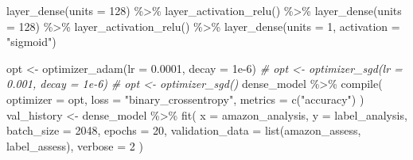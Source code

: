 \documentclass[
]{article}
\newenvironment{Shaded}{}{}
\newcommand{\AttributeTok}[1]{\textcolor[rgb]{0.49,0.56,0.16}{#1}}
\newcommand{\CommentTok}[1]{\textcolor[rgb]{0.38,0.63,0.69}{\textit{#1}}}
\newcommand{\DecValTok}[1]{\textcolor[rgb]{0.25,0.63,0.44}{#1}}
\newcommand{\FloatTok}[1]{\textcolor[rgb]{0.25,0.63,0.44}{#1}}
\newcommand{\FunctionTok}[1]{\textcolor[rgb]{0.02,0.16,0.49}{#1}}
\newcommand{\NormalTok}[1]{#1}
\newcommand{\OtherTok}[1]{\textcolor[rgb]{0.00,0.44,0.13}{#1}}
\newcommand{\SpecialCharTok}[1]{\textcolor[rgb]{0.25,0.44,0.63}{#1}}
\newcommand{\StringTok}[1]{\textcolor[rgb]{0.25,0.44,0.63}{#1}}
\begin{document}
\begin{Shaded}
\begin{Highlighting}[]
  \FunctionTok{layer\_dense}\NormalTok{(}\AttributeTok{units =} \DecValTok{128}\NormalTok{) }\SpecialCharTok{\%\textgreater{}\%}
  \FunctionTok{layer\_activation\_relu}\NormalTok{() }\SpecialCharTok{\%\textgreater{}\%}
  \FunctionTok{layer\_dense}\NormalTok{(}\AttributeTok{units =} \DecValTok{128}\NormalTok{) }\SpecialCharTok{\%\textgreater{}\%}
  \FunctionTok{layer\_activation\_relu}\NormalTok{() }\SpecialCharTok{\%\textgreater{}\%}
  \FunctionTok{layer\_dense}\NormalTok{(}\AttributeTok{units =} \DecValTok{1}\NormalTok{, }\AttributeTok{activation =} \StringTok{"sigmoid"}\NormalTok{)}

\NormalTok{opt }\OtherTok{\textless{}{-}} \FunctionTok{optimizer\_adam}\NormalTok{(}\AttributeTok{lr =} \FloatTok{0.0001}\NormalTok{, }\AttributeTok{decay =} \FloatTok{1e{-}6}\NormalTok{)}
\CommentTok{\# opt \textless{}{-} optimizer\_sgd(lr = 0.001, decay = 1e{-}6)}
\CommentTok{\# opt \textless{}{-} optimizer\_sgd()}
\NormalTok{dense\_model }\SpecialCharTok{\%\textgreater{}\%} \FunctionTok{compile}\NormalTok{(}
  \AttributeTok{optimizer =}\NormalTok{ opt,}
  \AttributeTok{loss =} \StringTok{"binary\_crossentropy"}\NormalTok{,}
  \AttributeTok{metrics =} \FunctionTok{c}\NormalTok{(}\StringTok{"accuracy"}\NormalTok{)}
\NormalTok{)}
\NormalTok{val\_history }\OtherTok{\textless{}{-}}\NormalTok{ dense\_model }\SpecialCharTok{\%\textgreater{}\%}
  \FunctionTok{fit}\NormalTok{(}
    \AttributeTok{x =}\NormalTok{ amazon\_analysis,}
    \AttributeTok{y =}\NormalTok{ label\_analysis,}
    \AttributeTok{batch\_size =} \DecValTok{2048}\NormalTok{,}
    \AttributeTok{epochs =} \DecValTok{20}\NormalTok{,}
    \AttributeTok{validation\_data =} \FunctionTok{list}\NormalTok{(amazon\_assess, label\_assess),}
    \AttributeTok{verbose =} \DecValTok{2}
\NormalTok{  )}


\end{Highlighting}
\end{Shaded}
\end{document}
